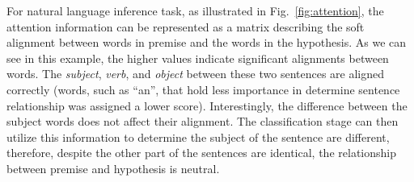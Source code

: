For natural language inference task, as illustrated in Fig.~\ref{fig:attention}, the attention information can be represented as a matrix describing the soft alignment between words in premise and the words in the hypothesis. As we can see in this example, the higher values indicate significant alignments between words. The \emph{subject}, \emph{verb}, and \emph{object} between these two sentences are aligned correctly (words, such as ``an'', that hold less importance in determine sentence relationship was assigned a lower score). Interestingly, the difference between the subject words does not affect their alignment. The classification stage can then utilize this information to determine the subject of the sentence are different, therefore, despite the other part of the sentences are identical, the relationship between premise and hypothesis is neutral.

